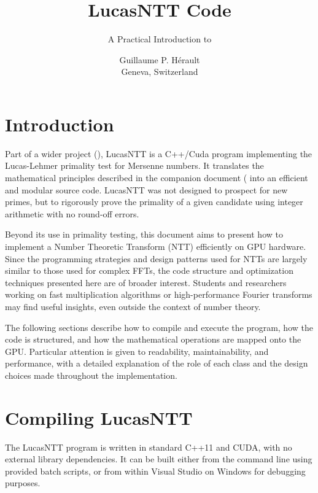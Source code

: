 \documentclass{article}
\subtitle{A Practical Introduction to}
\title{LucasNTT Code}
\author{
  Guillaume P. Hérault \\
  Geneva, Switzerland\\
}
\begin{document}
\maketitle
\theoremstyle{definition}



\section{Introduction}

Part of a wider project (\cite{LucasNTT}), LucasNTT is a C++/Cuda program implementing the Lucas-Lehmer primality test for Mersenne numbers. It translates the mathematical principles described in the companion document (\cite{LucasNTT_documents} into an efficient and modular source code. LucasNTT was not designed to prospect for new primes, but to rigorously prove the primality of a given candidate using integer arithmetic with no round-off errors.

Beyond its use in primality testing, this document aims to present how to implement a Number Theoretic Transform (NTT) efficiently on GPU hardware. Since the programming strategies and design patterns used for NTTs are largely similar to those used for complex FFTs, the code structure and optimization techniques presented here are of broader interest. Students and researchers working on fast multiplication algorithms or high-performance Fourier transforms may find useful insights, even outside the context of number theory.

The following sections describe how to compile and execute the program, how the code is structured, and how the mathematical operations are mapped onto the GPU. Particular attention is given to readability, maintainability, and performance, with a detailed explanation of the role of each class and the design choices made throughout the implementation.

\section{Compiling LucasNTT}
The LucasNTT program is written in standard C++11 and CUDA, with no external library dependencies. It can be built either from the command line using provided batch scripts, or from within Visual Studio on Windows for debugging purposes.
\end{document}
